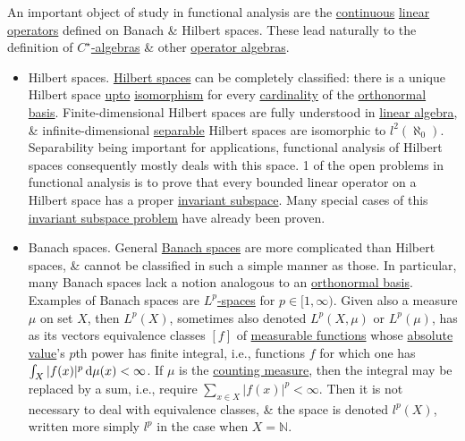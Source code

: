 \documentclass{article}
\begin{document}
An important object of study in functional analysis are the \href{https://en.wikipedia.org/wiki/Continuous_function_(topology)}{continuous} \href{https://en.wikipedia.org/wiki/Linear_transformation}{linear operators} defined on Banach \& Hilbert spaces. These lead naturally to the definition of \href{https://en.wikipedia.org/wiki/C*-algebra}{$C^\star$-algebras} \& other \href{https://en.wikipedia.org/wiki/Operator_algebra}{operator algebras}.
\begin{itemize}
	\item {\sf Hilbert spaces.} \href{https://en.wikipedia.org/wiki/Hilbert_space}{Hilbert spaces} can be completely classified: there is a unique Hilbert space \href{https://en.wikipedia.org/wiki/Up_to}{upto} \href{https://en.wikipedia.org/wiki/Isomorphism}{isomorphism} for every \href{https://en.wikipedia.org/wiki/Cardinal_number}{cardinality} of the \href{https://en.wikipedia.org/wiki/Orthonormal_basis}{orthonormal basis}. Finite-dimensional Hilbert spaces are fully understood in \href{https://en.wikipedia.org/wiki/Linear_algebra}{linear algebra}, \& infinite-dimensional \href{https://en.wikipedia.org/wiki/Separable_space}{separable} Hilbert spaces are isomorphic to $l^2(\aleph_0)$. Separability being important for applications, functional analysis of Hilbert spaces consequently mostly deals with this space. 1 of the open problems in functional analysis is to prove that every bounded linear operator on a Hilbert space has a proper \href{https://en.wikipedia.org/wiki/Invariant_subspace}{invariant subspace}. Many special cases of this \href{https://en.wikipedia.org/wiki/Invariant_subspace_problem}{invariant subspace problem} have already been proven.
	\item {\sf Banach spaces.} General \href{https://en.wikipedia.org/wiki/Banach_space}{Banach spaces} are more complicated than Hilbert spaces, \& cannot be classified in such a simple manner as those. In particular, many Banach spaces lack a notion analogous to an \href{https://en.wikipedia.org/wiki/Orthonormal_basis}{orthonormal basis}. Examples of Banach spaces are \href{https://en.wikipedia.org/wiki/Lp_space}{$L^p$-spaces} for $p\in[1,\infty)$. Given also a measure $\mu$ on set $X$, then $L^p(X)$, sometimes also denoted $L^p(X,\mu)$ or $L^p(\mu)$, has as its vectors equivalence classes $[f]$ of \href{https://en.wikipedia.org/wiki/Lebesgue-measurable_function}{measurable functions} whose \href{https://en.wikipedia.org/wiki/Absolute_value}{absolute value}'s $p$th power has finite integral, i.e., functions $f$ for which one has $\int_X |f(x)|^p\,{\rm d}\mu(x) < \infty$. If $\mu$ is the \href{https://en.wikipedia.org/wiki/Counting_measure}{counting measure}, then the integral may be replaced by a sum, i.e., require $\sum_{x\in X} |f(x)|^p < \infty$. Then it is not necessary to deal with equivalence classes, \& the space is denoted $l^p(X)$, written more simply $l^p$ in the case when $X = \mathbb{N}$.
	

\end{itemize}
\end{document}
